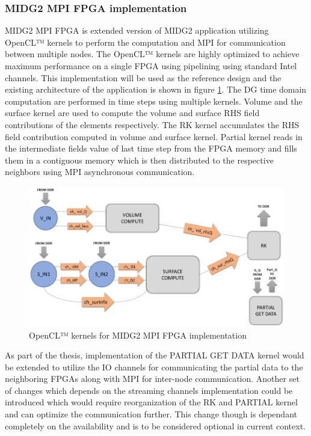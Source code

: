 \documentclass[english,notitlepage]{hgbreport}
\begin{document}
\subsubsection{MIDG2 MPI FPGA implementation}
MIDG2 MPI FPGA is extended version of MIDG2 application utilizing OpenCL™ kernels to perform the
computation and MPI for communication between multiple nodes. The OpenCL™ kernels are
highly optimized to achieve maximum performance on a single FPGA using pipelining using
standard Intel channels. This implementation will be used as the reference design and
the existing architecture of the application is shown in figure \ref{fig:kernels}.
The DG time domain computation are performed in time steps using multiple kernels.
Volume and the surface kernel are used to compute the volume and surface RHS field
contributions of the elements respectively. The RK kernel accumulates the RHS
field contribution computed in volume and surface kernel. Partial kernel reads in
the intermediate fields value of last time step from the FPGA memory and fills them
in a contiguous memory which is then distributed to the respective neighbors using
MPI asynchronous communication.

\begin{figure}[h]%
    \centering
    \includegraphics[width=1.0\textwidth]{images/kernels}
    \caption{OpenCL™ kernels for MIDG2 MPI FPGA implementation}
    \label{fig:kernels}
\end{figure}

As part of the thesis, implementation of the PARTIAL GET DATA kernel would be extended to utilize the IO channels
for communicating the partial data to the neighboring FPGAs along with MPI for inter-node communication.
Another set of changes which depends on the streaming channels
implementation could be introduced which would require reorganization of the RK and PARTIAL kernel and
can optimize the communication further. This change though is dependant
completely on the availability and is to be considered optional in current context. 
\end{document}
